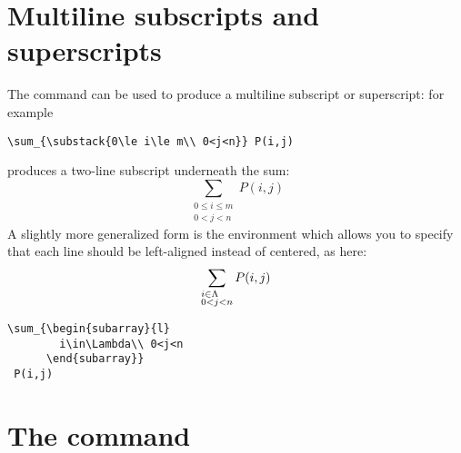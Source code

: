 \documentclass[leqno,titlepage,openany]{amsldoc}
\begin{document}
\section{Multiline subscripts and superscripts}

The  command can be used to produce a multiline subscript
or superscript:\relax
{} for example
\begin{verbatim}
\sum_{\substack{0\le i\le m\\ 0<j<n}} P(i,j)
\end{verbatim}
produces a two-line subscript underneath the sum:
\begin{equation}
\sum_{\substack{0\le i\le m\\ 0<j<n}} P(i,j)
\end{equation}
A slightly more generalized form is the  environment which
allows you to specify that each line should be left-aligned instead of
centered, as here:
\begin{equation}
\sum_{\begin{subarray}{l}
        i\in \Lambda\\ 0<j<n
      \end{subarray}}
 P(i,j)
\end{equation}
\begin{verbatim}
\sum_{\begin{subarray}{l}
        i\in\Lambda\\ 0<j<n
      \end{subarray}}
 P(i,j)
\end{verbatim}

\section{The  command}\label{sideset}
\end{document}
